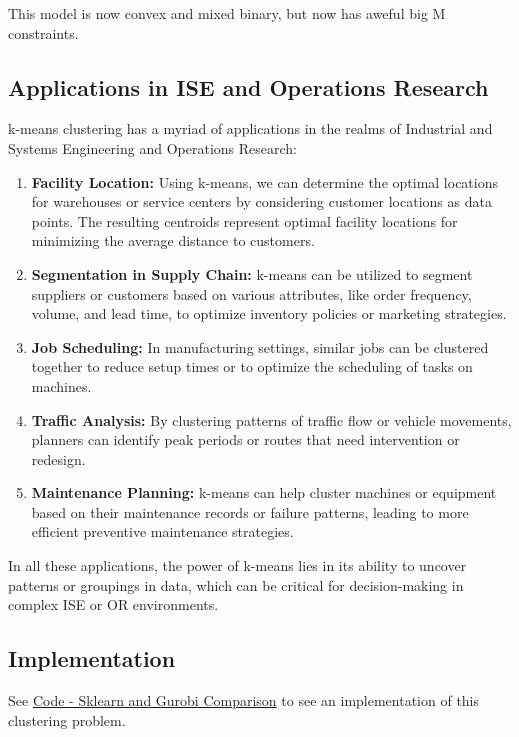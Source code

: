 This model is now convex and mixed binary, but now has aweful big M constraints.

\subsection{Applications in ISE and Operations Research}

k-means clustering has a myriad of applications in the realms of Industrial and Systems Engineering and Operations Research:

\begin{enumerate}
    \item \textbf{Facility Location:} Using k-means, we can determine the optimal locations for warehouses or service centers by considering customer locations as data points. The resulting centroids represent optimal facility locations for minimizing the average distance to customers.
    
    \item \textbf{Segmentation in Supply Chain:} k-means can be utilized to segment suppliers or customers based on various attributes, like order frequency, volume, and lead time, to optimize inventory policies or marketing strategies.
    
    \item \textbf{Job Scheduling:} In manufacturing settings, similar jobs can be clustered together to reduce setup times or to optimize the scheduling of tasks on machines.
    
    \item \textbf{Traffic Analysis:} By clustering patterns of traffic flow or vehicle movements, planners can identify peak periods or routes that need intervention or redesign.
    
    \item \textbf{Maintenance Planning:} k-means can help cluster machines or equipment based on their maintenance records or failure patterns, leading to more efficient preventive maintenance strategies.
\end{enumerate}

In all these applications, the power of k-means lies in its ability to uncover patterns or groupings in data, which can be critical for decision-making in complex ISE or OR environments.

\subsection{Implementation}
See \href{https://github.com/open-optimization/open-optimization-or-examples/blob/master/nonlinear-programming/k-means-clustering.ipynb}{Code - Sklearn and Gurobi Comparison} to see an implementation of this clustering problem.

